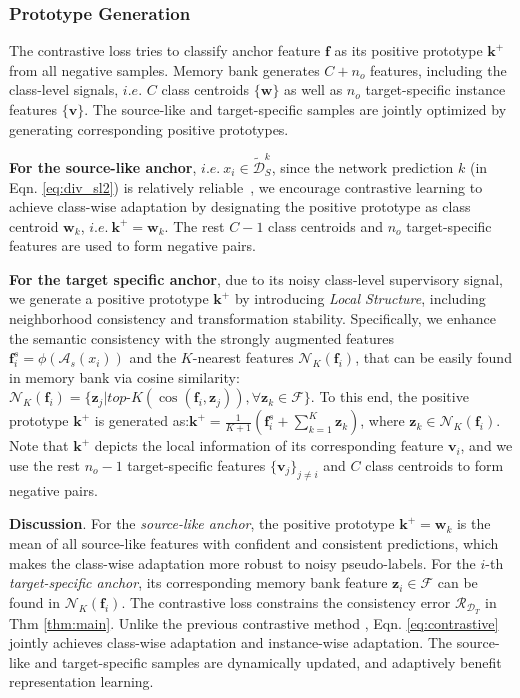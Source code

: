 \documentclass{article}
\def\vf{{\bm{f}}}
\def\vk{{\bm{k}}}
\def\vv{{\bm{v}}}
\def\vw{{\bm{w}}}
\def\vz{{\bm{z}}}
\begin{document}
\subsubsection{Prototype Generation}
The contrastive loss tries to classify anchor feature $\vf$ as its positive prototype $\vk^+$ from all negative samples. 
Memory bank generates $C+n_o$ features, including the class-level signals, $i.e.$ $C$ class centroids $\{\vw \}$ as well as $n_o$ target-specific instance features $\{\vv\}$. The source-like and target-specific samples are jointly optimized by generating corresponding positive prototypes.

\textbf{For the source-like anchor}, $i.e.\ x_i\in \tilde{\mathcal{D}}_{S}^k$, since the network prediction $k$ (in Eqn. \ref{eq:div_sl2}) is relatively reliable~\cite{kim2020PrDA}, we encourage contrastive learning to achieve class-wise adaptation by designating the positive prototype as class centroid $\vw_k$, $i.e. \ \vk^+ = \vw_k$. The rest $C-1$ class centroids and $n_o$ target-specific features are used to form negative pairs.

\textbf{For the target specific anchor}, due to its noisy class-level supervisory signal, we generate a positive prototype $\vk^+$ by introducing \textit{Local Structure}, including neighborhood consistency and transformation stability. Specifically, we enhance the semantic consistency with the strongly augmented features $\vf_i^s = \phi(\mathcal{A}_s(x_i))$ and the $K$-nearest features $\mathcal{N}_K(\vf_i)$, that can be easily found in memory bank via cosine similarity: $\mathcal{N}_K(\vf_i) = \{\vz_j|\textit{top-K}\left(\cos(\vf_i,\vz_j )\right),\forall \vz_k\in \mathcal{F} \}$. To this end, the positive prototype $\vk^+$ is generated as:$\vk^+ = \frac{1}{K+1}\left(\vf_i^s + \sum_{k=1}^K  \vz_k\right)$, where $\vz_k \in\mathcal{N}_K(\vf_i)$. Note that $\vk^+$ depicts the local information of its corresponding feature $\vv_i$, and we use the rest $n_o-1$ target-specific features $\{\vv_j\}_{j\neq i}$ and $C$ class centroids to form negative pairs.

 

\textbf{Discussion}. For the \textit{source-like anchor}, the positive prototype $\vk^+ = \vw_k$ is the mean of all source-like features with confident and consistent predictions, which makes the class-wise adaptation more robust to noisy pseudo-labels. For the $i$-th \textit{target-specific anchor}, its corresponding memory bank feature $\vz_i\in\mathcal{F}$ can be found in $\mathcal{N}_K(\vf_i)$. The contrastive loss constrains the consistency error $\mathcal{R}_{\mathcal{D}_T}$ in Thm \ref{thm:main}. 
Unlike the previous contrastive method \cite{Qiu2021ijcai}, Eqn. \ref{eq:contrastive} jointly achieves class-wise adaptation and instance-wise adaptation. 
The source-like and target-specific samples are dynamically updated, and adaptively benefit representation learning.
\end{document}
